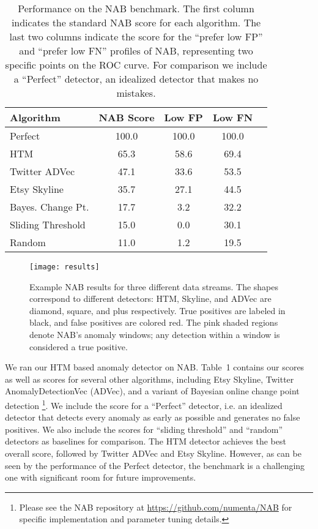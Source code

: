 \documentclass{article}
\begin{document}
\begin{table}[t]
\begin{center}
\begin{small}
\begin{sc}
\begin{tabular}{lcccr}
\hline
\abovespace\belowspace
Algorithm & NAB Score & Low FP & Low FN \\
\hline
\abovespace
Perfect          & 100.0 & 100.0   & 100.0 \\
HTM             & 65.3 & 58.6  & 69.4 \\
Twitter ADVec   & 47.1  & 33.6   & 53.5 \\
Etsy Skyline    & 35.7  & 27.1   & 44.5 \\
Bayes. Change Pt. & 17.7 & 3.2 & 32.2 \\
Sliding Threshold & 15.0 & 0.0 & 30.1 \\
\belowspace
Random          & 11.0  & 1.2    & 19.5 \\
\hline
\end{tabular}
\end{sc}
\end{small}
\end{center}
\vskip -0.1in
\label{results-table}
\caption{Performance on the NAB benchmark. The first column indicates
the standard NAB score for each algorithm. The last two columns indicate the
score for the ``prefer low FP'' and ``prefer low FN'' profiles of NAB,
representing two specific points on the ROC curve. For comparison we include
a ``Perfect'' detector, an idealized detector that makes no mistakes. }
\end{table}

\begin{figure*}[ht]
\vskip 0.2in
\begin{center}
\centerline{\texttt{[image: results]}}
\caption{Example NAB results for three different data streams. The shapes
correspond to different detectors: HTM, Skyline, and ADVec are diamond, square,
and plus respectively. True positives are labeled in black, and false positives
are colored red. The pink shaded regions denote NAB's anomaly windows;
any detection within a window is considered a true positive.}
\label{results}
\end{center}
\vskip -0.2in
\end{figure*}

We ran our HTM based anomaly detector on NAB.  Table~1 contains our scores as
well as scores for several other algorithms, including Etsy Skyline, Twitter
AnomalyDetectionVec (ADVec), and a variant of Bayesian online change point
detection \cite{Adams2007}\footnote{Please see the NAB repository at
\url{https://github.com/numenta/NAB} for specific implementation and parameter
tuning details.}. We include the score for a ``Perfect'' detector, i.e. an
idealized detector that detects every anomaly as early as possible and generates
no false positives. We also include the scores for ``sliding threshold'' and
``random'' detectors as baselines for comparison. The HTM detector achieves the
best overall score, followed by Twitter ADVec and Etsy Skyline.
However, as can
be seen by the performance of the Perfect detector, the benchmark is a
challenging one with significant room for future improvements.
\end{document}
